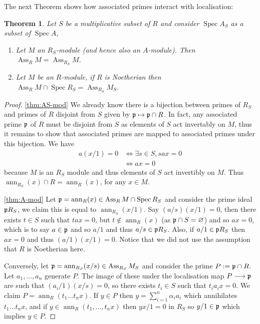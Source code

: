 \documentclass[12pt]{article}
\theoremstyle{plain}
\newtheorem{thm}{Theorem}[subsection] %
\theoremstyle{definition}
\newcommand{\lto}{\longrightarrow}
\begin{document}
The next Theorem shows how associated primes interact with localisation:
\begin{thm}
\label{thm:primes_loc_interact}
Let $S$ be a multiplicative subset of $R$ and consider $\operatorname{Spec}A_S$ as a subset of $\operatorname{Spec}A$,
\begin{enumerate}
    \item\label{thm:AS-mod} Let $M$ an $R_S$-module (and hence also an $A$-module). Then $\operatorname{Ass}_RM = \operatorname{Ass}_{R_S}M$.
    \item\label{thm:A-mod} Let $M$ be an $R$-module, if $R$ is Noetherian then $\operatorname{Ass}_RM \cap \operatorname{Spec}R_S = \operatorname{Ass}_{R_S}M_S$.
\end{enumerate}
\end{thm}
\begin{proof}
\eqref{thm:AS-mod} We already know there is a bijection between primes of $R_S$ and primes of $R$ disjoint from $S$ given by $\frak{p} \mapsto \frak{p} \cap R$. In fact, any associated prime $\frak{p}$ of $R$ must be disjoint from $S$ as elements of $S$ act invertably on $M$, thus it remains to show that associated primes are mapped to associated primes under this bijection. We have
\begin{align*}
    a(x/1) = 0 &\Leftrightarrow \exists s \in S,\text{}sax = 0\\
    &\Leftrightarrow ax = 0
\end{align*}
because $M$ is an $R_S$ module and thus elements of $S$ act invertibly on $M$. Thus $\operatorname{ann}_{R_S}(x) \cap R = \operatorname{ann}_{R}(x)$, for any $x \in M$.

\eqref{thm:A-mod} Let $\frak{p} = \operatorname{ann}_R(x) \in \operatorname{Ass}_RM \cap \operatorname{Spec}R_S$ and consider the prime ideal $\frak{p}R_S$, we claim this is equal to $\operatorname{ann}_{R_S}(x/1)$. Say $(a/s)(x/1) = 0$, then there exists $t \in S$ such that $tax = 0$, but $t \not\in \operatorname{ann}_R(x)$ (as $\frak{p} \cap S = \varnothing$) and so $ax = 0$, which is to say $a \in \frak{p}$ and so $a/1$ and thus $a/s \in \frak{p}R_S$. Also, if $a/1 \in \frak{p}R_S$ then $ax = 0$ and thus $(a/1)(x/1) = 0$. Notice that we did not use the assumption that $R$ is Noetherian here.

Conversely, let $\frak{p} = \operatorname{ann}_{R_S}(x/s) \in \operatorname{Ass}_{R_S}M_S$ and consider the prime $P := \frak{p} \cap R$. Let $a_1,...,a_n$ generate $P$. The image of these under the localisation map $P \lto \frak{p}$ are such that $(a_i/1)(x/s) = 0$, so there exists $t_i \in S$ such that $t_i a_i x = 0$. We claim $P = \operatorname{ann}_R(t_1...t_nx)$. If $y \in P$ then $y = \sum_{i = 1}^n \alpha_i a_i$ which annihilates $t_1...t_nx$, and if $y \in \operatorname{ann}_R(t_1,...,t_nx)$ then $yx/1 = 0$ in $R_S$ so $y/1 \in \frak{p}$ which implies $y \in P$.
\end{proof}
\end{document}

